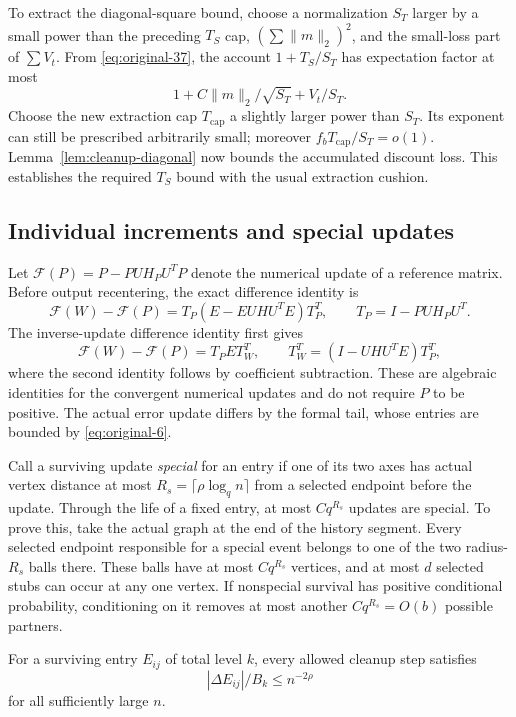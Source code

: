 To extract the diagonal-square bound, choose a normalization $S_T$
larger by a small power than the preceding $T_S$ cap,
$(\sum\|m\|_2)^2$, and the small-loss part of $\sum V_t$.
From \eqref{eq:original-37}, the account $1+T_S/S_T$ has
expectation factor at most
\[
 1+C\|m\|_2/\sqrt{S_T}+V_t/S_T.
\]
Choose the new extraction cap $T_{\mathrm{cap}}$ a slightly
larger power than $S_T$.  Its exponent can still be prescribed
arbitrarily small; moreover $f_bT_{\mathrm{cap}}/S_T=o(1)$.
Lemma~\ref{lem:cleanup-diagonal} now bounds the accumulated
discount loss.  This establishes the required $T_S$ bound with
the usual extraction cushion.

\subsection{Individual increments and special updates}

Let $\mathcal F(P)=P-PUH_PU^TP$ denote the numerical update of
a reference matrix.  Before output recentering, the exact
difference identity is
\begin{equation}
 \mathcal F(W)-\mathcal F(P)
   =T_P(E-EUHU^TE)T_P^T,
 \qquad T_P=I-PUH_PU^T.
\label{eq:original-38}
\end{equation}
The inverse-update difference identity first gives
\[
 \mathcal F(W)-\mathcal F(P)=T_PE T_W^T,
 \qquad T_W^T=(I-UHU^TE)T_P^T,
\]
where the second identity follows by coefficient subtraction.
These are algebraic identities for
the convergent numerical updates and do not require $P$ to be
positive.  The actual error update differs by the formal tail,
whose entries are bounded by \eqref{eq:original-6}.

Call a surviving update \emph{special} for an entry if one of its
two axes has actual vertex distance at most
$R_s=\lceil\rho\log_q n\rceil$ from a selected endpoint before
the update.  Through the life of a fixed entry, at most
$Cq^{R_s}$ updates are special.  To prove this, take the actual
graph at the end of the history segment.  Every selected
endpoint responsible for a special event belongs to one of
the two radius-$R_s$ balls there.  These balls have at most
$Cq^{R_s}$ vertices, and at most $d$ selected stubs can occur
at any one vertex.  If nonspecial survival has positive
conditional probability, conditioning on it removes at most
another $Cq^{R_s}=O(b)$ possible partners.

\begin{lemma}
\label{lem:cleanup-jumps}
For a surviving entry $E_{ij}$ of total level $k$, every allowed cleanup
step satisfies
\[
 |\Delta E_{ij}|/B_k\leq n^{-2\rho}
\]
for all sufficiently large $n$.
\end{lemma}

